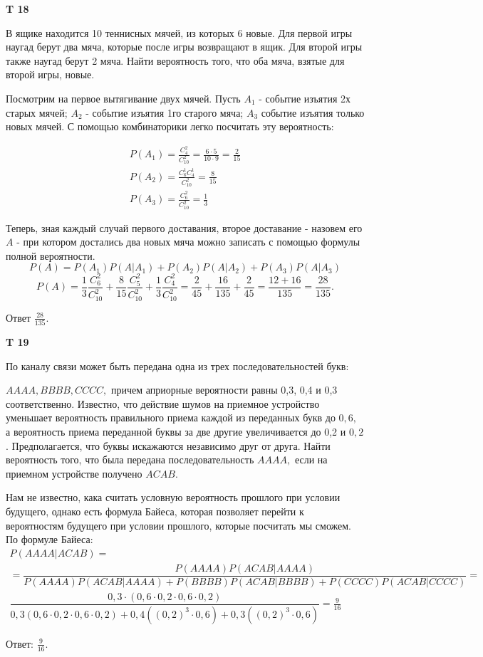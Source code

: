 \documentclass[a4paper,12pt]{article} %
\begin{document}
\begin{example}\textbf{T 18}

В ящике находится 10 теннисных мячей, из которых 6 новые. 
Для первой игры наугад берут два мяча, которые после игры возвращают в ящик. 
Для второй игры также наугад берут 2 мяча. 
Найти вероятность того, что оба мяча, взятые для второй игры, новые.

Посмотрим на первое вытягивание двух мячей. Пусть $ A_1$ - событие изъятия 2х старых мячей; 
$A_2$ - событие изъятия 1го старого мяча; 
$A_3$ событие изъятия только новых мячей.
С помощью комбинаторики легко посчитать эту вероятность:

\begin{align}
P(A_1)=\frac{C_4^2}{C_10^2}=\frac{6\cdot 5}{10\cdot 9}=\frac{2}{15} \\
P(A_2)=\frac{C_6^1C_4^1}{C_10^2}=\frac{8}{15}\\
P(A_3)=\frac{C_6^2}{C_10^2}=\frac{1}{3}
\end{align}

Теперь, зная каждый случай первого доставания, второе доставание - назовем его $A$ - при котором достались два новых мяча можно записать с помощью формулы полной вероятности.
$$ P(A)=P(A_1) P(A|A_1)+P(A_2) P(A|A_2)+P(A_3) P(A|A_3)$$
\[ P(A)=\frac{1}{3}\frac{C_6^2}{C_{10}^2}+\frac{8}{15} \frac{C_5^2}{C_{10}^2} +\frac{1}{3}\frac{C_4^2}{C_{10}^2}=\frac{2}{45}+\frac{16}{135}+\frac{2}{45}=
\frac{12+16}{135}=\frac{28}{135}.
\]

Ответ $ \frac{28}{135}$.


\end{example}



\begin{example}\textbf{T 19}

По каналу связи может быть передана одна из трех последовательностей букв: 

$A A A A, B B B B, C C C C,$ причем априорные вероятности равны 0,3, 0,4 и 0,3 соответственно. 
Известно, что действие шумов на приемное устройство уменьшает вероятность правильного приема каждой из переданных букв до $0,6,$ 
а вероятность приема переданной буквы за две другие увеличивается до 0,2 и $0,2$. 
Предполагается, что буквы искажаются независимо друг от друга. 
Найти вероятность того, что была передана последовательность $A A A A,$ если на приемном устройстве получено $A C A B$.

Нам не известно, кака считать условную вероятность прошлого при условии будущего, однако есть формула Байеса, 
которая позволяет перейти к вероятностям будущего при условии прошлого, которые посчитать мы сможем.
По формуле Байеса:
\begin{multline}
P(AAAA|ACAB)=\\
=\dfrac{P(AAAA) P(ACAB|AAAA)}{P(AAAA) P(ACAB|AAAA) + P(BBBB) P(ACAB|BBBB)+ P(CCCC) P(ACAB|CCCC) }=\\
\dfrac{0,3\cdot (0,6 \cdot  0,2 \cdot 0,6 \cdot 0,2)}{0,3 (0,6 \cdot  0,2 \cdot 0,6 \cdot 0,2)+ 0,4 ((0,2)^3\cdot 0,6) +0,3 ((0,2)^3 \cdot 0,6)}=
\frac{9}{16} 
\end{multline}


Ответ: $\frac{9}{16}$.


\end{example}
\end{document}

